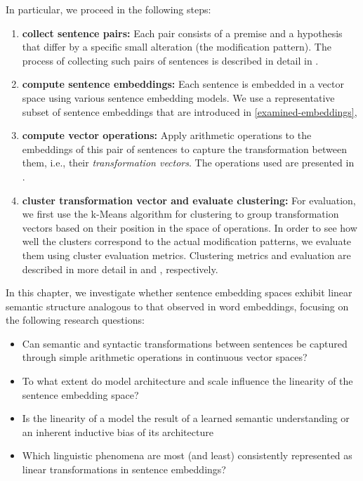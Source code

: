 In particular, we proceed in the following steps:
\begin{enumerate}
    \item \textbf{collect sentence pairs:} Each pair consists of a premise and a hypothesis that differ by a specific small alteration (the modification pattern). The process of collecting such pairs of sentences is described in detail in .
    \item \textbf{compute sentence embeddings:} Each sentence is embedded in a vector space using various sentence embedding models. We use a representative subset of sentence embeddings that are introduced in \cref{examined-embeddings},   
    \item \textbf{compute vector operations:} Apply arithmetic operations to the embeddings of this pair of sentences to capture the transformation between them, i.e., their \textit{transformation vectors}. The operations used are presented in .
    \item \textbf{cluster transformation vector and evaluate clustering:} For evaluation, we first use the k-Means algorithm for clustering to group transformation vectors based on their position in the space of operations. In order to see how well the clusters correspond to the actual modification patterns, we evaluate them using cluster evaluation metrics. Clustering metrics and evaluation are described in more detail in  and , respectively.
\end{enumerate}

\begin{mdframed}[
    linecolor=gray,
    linewidth=2pt,
    roundcorner=5,
    backgroundcolor=gray!5
]
\noindent
In this chapter, we investigate whether sentence embedding spaces exhibit linear semantic structure analogous to that observed in word embeddings, focusing on the following research questions:

\begin{itemize}
    \item Can semantic and syntactic transformations between sentences be captured through simple arithmetic operations in continuous vector spaces?
    \item To what extent do model architecture and scale influence the linearity of the sentence embedding space?
    \item Is the linearity of a model the result of a learned semantic understanding or an inherent inductive bias of its architecture
    \item Which linguistic phenomena are most (and least) consistently represented as linear transformations in sentence embeddings?
\end{itemize}
\end{mdframed}

